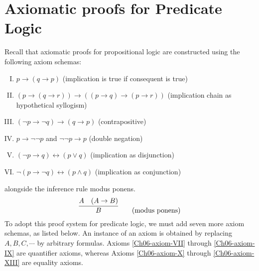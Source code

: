 \section{Axiomatic proofs for Predicate Logic}

Recall that axiomatic proofs for propositional logic are constructed using the following axiom schemas:
%
\begin{enumerate}[I.]
    \item \(p \rightarrow (q \rightarrow p)\)
    \hfill (implication is true if consequent is true)
    \label{Ch06-axiom-I}
    
    \item \((p \rightarrow (q \rightarrow r)) \rightarrow ((p \rightarrow q) \rightarrow (p \rightarrow r))\)
    \hfill (implication chain as hypothetical syllogism)
    \label{Ch06-axiom-II}
    
    \item \((\neg p \rightarrow \neg q) \rightarrow (q \rightarrow p)\)
    \hfill (contrapositive)
    \label{Ch06-axiom-III}

    \item \(p \rightarrow \neg\neg p\) and \(\neg\neg p \rightarrow p\)
    \hfill (double negation)
    \label{Ch06-axiom-IV}
    
    \item \((\neg p \rightarrow q) \leftrightarrow (p \lor q)\)
    \hfill (implication as disjunction)
    \label{Ch06-axiom-V}
    
    \item \(\neg(p \rightarrow \neg q) \leftrightarrow (p \land q)\)
    \hfill (implication as conjunction)
    \label{Ch06-axiom-VI}
\end{enumerate}
%
alongside the inference rule modus ponens.
%
\[
    \infer{B}{
        A
        &
        (A\rightarrow B)
    }
    \tag{modus ponens}
\]
%
To adopt this proof system for predicate logic, we must add seven more axiom schemas, as listed below.  An instance of an axiom is obtained by replacing \(A, B, C, \cdots\) by arbitrary formulas. Axioms \ref{Ch06-axiom-VII} through \ref{Ch06-axiom-IX} are quantifier axioms, whereas Axioms \ref{Ch06-axiom-X} through \ref{Ch06-axiom-XIII} are equality axioms.
%
